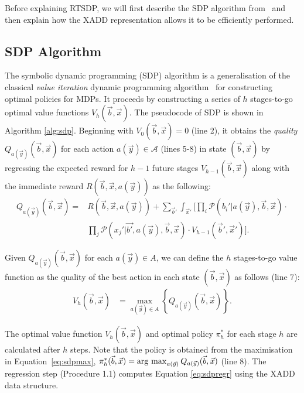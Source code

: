 Before explaining RTSDP, we will first describe the SDP algorithm from~\cite{zamani12} and then explain how the XADD representation allows it to be efficiently performed.

\subsection{SDP Algorithm}

The symbolic dynamic programming (SDP) algorithm is a generalisation of the classical {\it value iteration} dynamic programming algorithm~\cite{bellman57} for constructing optimal policies for MDPs.
It proceeds by constructing a series of $h$ stages-to-go optimal value functions $V_h(\vec{b},\vec{x})$.
The pseudocode of SDP is shown in Algorithm \ref{alg:sdp}.
Beginning with $V_0(\vec{b},\vec{x}) = 0$ (line 2), it obtains the \emph{quality} $Q_{a(\vec{y})}(\vec{b},\vec{x})$ for each action $a(\vec{y}) \in \mathcal{A}$ (lines 5-8) in state $(\vec{b},\vec{x})$ by regressing the expected reward for $h-1$ future stages $V_{h-1}(\vec{b},\vec{x})$ along with the immediate reward $R(\vec{b},\vec{x},a(\vec{y}))$ as the following:
\begin{align}
Q_{a(\vec{y})}(\vec{b},\vec{x}) = & R(\vec{b},\vec{x},a(\vec{y})) + \sum_{\vec{b}'} \int_{\vec{x}'} \Bigg[ 
\prod_i \mathcal{P}(b_i' | a(\vec{y}),\vec{b},\vec{x}) \cdot  \nonumber \\  & \prod_j \mathcal{P}(x_j' | \vec{b'}, a(\vec{y}),\vec{b},\vec{x})\cdot V_{h-1}(\vec{b}',\vec{x}') \Bigg]. \label{eq:sdpregr} 
\end{align}

Given $Q_{a(\vec{y})}(\vec{b},\vec{x})$ for each $a(\vec{y}) \in A$, we can define the $h$ stages-to-go value function as the quality of the best action in each state $(\vec{b},\vec{x})$ as follows (line 7):
\begin{align}
V_{h}(\vec{b},\vec{x}) & = \max_{a(\vec{y}) \in A} \left\{ Q_{a(\vec{y})}(\vec{b},\vec{x}) \right\}. \label{eq:sdpmax}
\end{align}

The optimal value function $V_h(\vec{b},\vec{x})$ and optimal policy $\pi^*_h$ for each stage $h$ are calculated after $h$ steps. Note that the policy is obtained from the maximisation in Equation~\ref{eq:sdpmax}, $\pi^*_h(\vec{b},\vec{x}) = \argmax_{a(\vec{y})} Q_{a(\vec{y})}(\vec{b},\vec{x})$ (line 8). 
The regression step (Procedure 1.1) computes Equation \ref{eq:sdpregr} using the XADD data structure.

